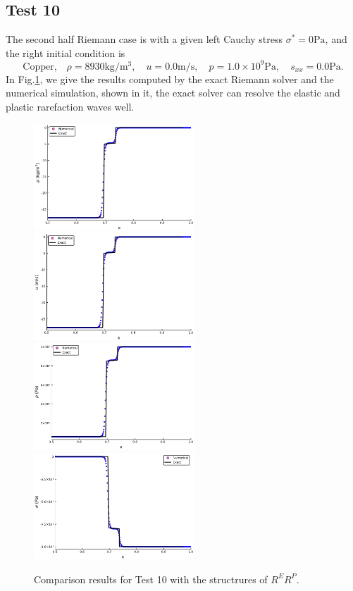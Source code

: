 \documentclass[review]{elsarticle}
\begin{document}
\subsection{Test 10}
The second half Riemann case is with  a given left Cauchy stress $\sigma^* = 0 \text{Pa}$, and the right initial condition is
\begin{equation}
  \text{Copper,}\quad\rho = 8930\text{kg}/\text{m}^3, \quad  u = 0.0\text{m}/\text{s}, \quad  p =1.0\times 10^9 \text{Pa}, \quad  s_{xx}=0.0\text{Pa}.
\end{equation}
In Fig.\ref{fig:case10}, we give the results computed by the exact Riemann solver and the numerical simulation, shown in it, the exact solver can resolve the elastic and plastic rarefaction waves well.
\begin{figure}
  \centering
  \includegraphics[width= 6cm] {case11rho.pdf}
  \includegraphics[width= 6cm] {case11u.pdf}
  \includegraphics[width= 6cm] {case11p.pdf}
  \includegraphics[width= 6cm] {case11sigma.pdf}
    \caption{Comparison results for Test 10 with the structrures of $R^ER^P$.  }
  \label{fig:case10}
\end{figure}
\end{document}
